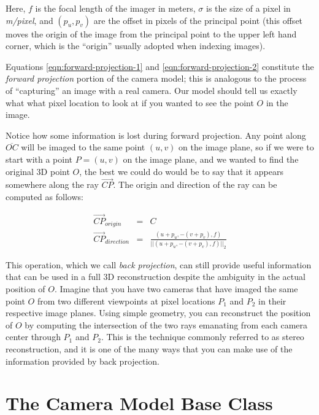 Here, $f$ is the focal length of the imager in meters, $\sigma$ is the
size of a pixel in {\em m/pixel}, and $(p_u, p_v)$ are the offset in
pixels of the principal point (this offset moves the origin of the
image from the principal point to the upper left hand corner, which is
the ``origin'' usually adopted when indexing images).  

Equations \ref{eqn:forward-projection-1} and
\ref{eqn:forward-projection-2} constitute the {\em forward projection}
portion of the camera model; this is analogous to the process of
``capturing'' an image with a real camera.  Our model should tell us
exactly what what pixel location to look at if you wanted to see the
point $O$ in the image.

Notice how some information is lost during forward projection.  Any
point along $\overline{OC}$ will be imaged to the same point $(u,v)$
on the image plane, so if we were to start with a point $P=(u,v)$ on
the image plane, and we wanted to find the original 3D point $O$, the
best we could do would be to say that it appears somewhere along the
ray $\overrightarrow{CP}$. The
origin and direction of the ray can be computed as follows:

\begin{eqnarray}
\label{eqn:reverse-projection-1}
\overrightarrow{CP}_{origin} & = & C \\
\label{eqn:reverse-projection-2}
\overrightarrow{CP}_{direction} & = & \frac{(u + p_u, -(v + p_v), f)} {||(u + p_u, -(v + p_v), f)||_2}
\end{eqnarray}

This operation, which we call {\em back projection}, can still
provide useful information that can be used in a full 3D
reconstruction despite the ambiguity in the actual position of $O$.
Imagine that you have two cameras that have imaged the same point $O$
from two different viewpoints at pixel locations $P_1$ and $P_2$ in
their respective image planes.  Using simple geometry, you can
reconstruct the position of $O$ by computing the intersection of the
two rays emanating from each camera center through $P_1$ and $P_2$.
This is the technique commonly referred to as stereo reconstruction,
and it is one of the many ways that you can make use of the
information provided by back projection.

\section{The Camera Model Base Class}

